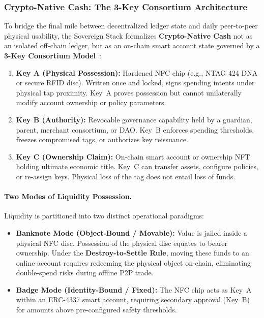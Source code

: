 \documentclass[a4paper,11pt,twoside,parskip=half-,headings=small]{scrartcl}
\begin{document}
\subsubsection{Crypto-Native Cash: The 3-Key Consortium Architecture}
\label{sec:crypto_cash_consortium}

To bridge the final mile between decentralized ledger state and daily peer-to-peer physical usability, the Sovereign Stack formalizes \textbf{Crypto-Native Cash} not as an isolated off-chain ledger, but as an on-chain smart account state governed by a \textbf{3-Key Consortium Model}~\cite{blum2024lightbook,blum2024vision}:
\begin{enumerate}[nosep]
  \item \textbf{Key A (Physical Possession):} Hardened NFC chip (e.g., NTAG 424 DNA or secure RFID disc). Written once and locked, signs spending intents under physical tap proximity. Key~A proves possession but cannot unilaterally modify account ownership or policy parameters.
  \item \textbf{Key B (Authority):} Revocable governance capability held by a guardian, parent, merchant consortium, or DAO. Key~B enforces spending thresholds, freezes compromised tags, or authorizes key reissuance.
  \item \textbf{Key C (Ownership Claim):} On-chain smart account or ownership NFT holding ultimate economic title. Key~C can transfer assets, configure policies, or re-assign keys. Physical loss of the tag does not entail loss of funds.
\end{enumerate}

\paragraph{Two Modes of Liquidity Possession.}
Liquidity is partitioned into two distinct operational paradigms:
\begin{itemize}[nosep]
  \item \textbf{Banknote Mode (Object-Bound / Movable):} Value is jailed inside a physical NFC disc. Possession of the physical disc equates to bearer ownership. Under the \textbf{Destroy-to-Settle Rule}, moving these funds to an online account requires redeeming the physical object on-chain, eliminating double-spend risks during offline P2P trade.
  \item \textbf{Badge Mode (Identity-Bound / Fixed):} The NFC chip acts as Key~A within an ERC-4337 smart account, requiring secondary approval (Key~B) for amounts above pre-configured safety thresholds.
\end{itemize}
\end{document}
